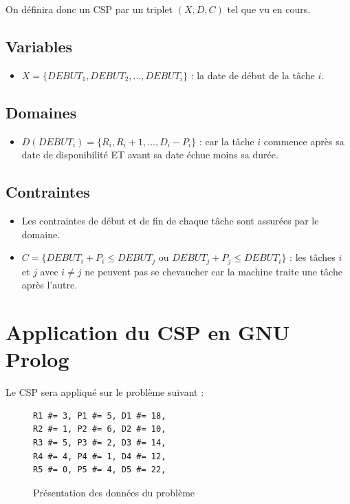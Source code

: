 \documentclass{latexPackage/utc-report/utc-report}
\begin{document}
On définira donc un CSP par un triplet $(X, D, C)$ tel que vu en cours.

\subsection{Variables}

\begin{itemize}
    \item $X = \{DEBUT_1, DEBUT_2, ... , DEBUT_i\}$ : la date de début de la tâche $i$.
\end{itemize}

\subsection{Domaines}

\begin{itemize}
    \item $D(DEBUT_i) = \{R_i, R_i + 1, ..., D_i - P_i\}$ : car la tâche $i$ commence après sa date de disponibilité ET avant sa date échue moins sa durée.
\end{itemize}

\subsection{Contraintes}

\begin{itemize}
    \item Les contraintes de début et de fin de chaque tâche sont assurées par le domaine.
    \item $C = \{DEBUT_i + P_i \leq DEBUT_j \text{ ou } DEBUT_j + P_j \leq DEBUT_i\}$ : les tâches $i$ et $j$ avec $i \neq j$ ne peuvent pas se chevaucher car la machine traite une tâche après l'autre.
\end{itemize}

\pagebreak

\section{Application du CSP en GNU Prolog}

Le CSP sera appliqué sur le problème suivant :

\begin{figure}[h!]
    \begin{verbatim}
R1 #= 3, P1 #= 5, D1 #= 18,
R2 #= 1, P2 #= 6, D2 #= 10,
R3 #= 5, P3 #= 2, D3 #= 14,
R4 #= 4, P4 #= 1, D4 #= 12,
R5 #= 0, P5 #= 4, D5 #= 22,
    \end{verbatim}
    \caption{Présentation des données du problème}
\end{figure}
\end{document}

